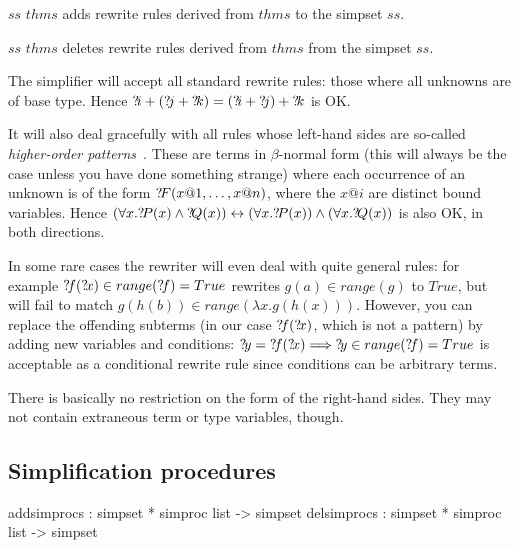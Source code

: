 \begin{ttdescription}
  
\item[$ss$ \ttindexbold{addsimps} $thms$] adds rewrite rules derived
  from $thms$ to the simpset $ss$.
  
\item[$ss$ \ttindexbold{delsimps} $thms$] deletes rewrite rules
  derived from $thms$ from the simpset $ss$.

\end{ttdescription}

\begin{warn}
  The simplifier will accept all standard rewrite rules: those where
  all unknowns are of base type.  Hence ${{?\!i}+({?\!j}+{?\!k})} =
  {({?\!i}+{?\!j})+{?\!k}}$ is OK.
  
  It will also deal gracefully with all rules whose left-hand sides
  are so-called {\em higher-order patterns}~\cite{nipkow-patterns}.
  These are terms in $\beta$-normal form (this will always be the case
  unless you have done something strange) where each occurrence of an
  unknown is of the form ${?\!F}(x@1,\dots,x@n)$, where the $x@i$ are
  distinct bound variables. Hence $(\forall x.{?\!P}(x) \land
  {?\!Q}(x)) \leftrightarrow (\forall x.{?\!P}(x)) \land (\forall
  x.{?\!Q}(x))$ is also OK, in both directions.
  
  In some rare cases the rewriter will even deal with quite general
  rules: for example ${{?\!f}({?\!x})\in range({?\!f})} = True$
  rewrites $g(a) \in range(g)$ to $True$, but will fail to match
  $g(h(b)) \in range(\lambda x.g(h(x)))$.  However, you can replace
  the offending subterms (in our case ${?\!f}({?\!x})$, which is not
  a pattern) by adding new variables and conditions: ${?\!y} =
  {?\!f}({?\!x}) \Longrightarrow {?\!y}\in range({?\!f}) = True$ is
  acceptable as a conditional rewrite rule since conditions can be
  arbitrary terms.
  
  There is basically no restriction on the form of the right-hand
  sides.  They may not contain extraneous term or type variables,
  though.
\end{warn}


\subsection{Simplification procedures}
\begin{ttbox}
addsimprocs : simpset * simproc list -> simpset
delsimprocs : simpset * simproc list -> simpset
\end{ttbox}

